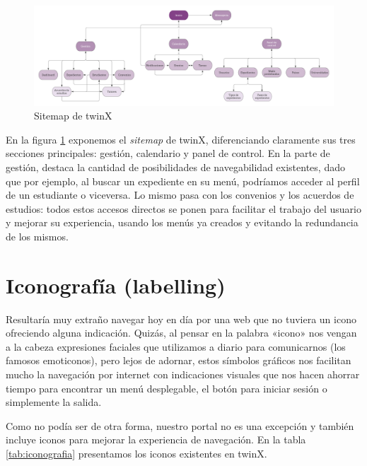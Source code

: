 \begin{figure}
	\centering
	\includegraphics[width=\textwidth]{img/sitemap}
	\caption{Sitemap de twinX}
	\label{fig:sitemap}
\end{figure}

En la figura \ref{fig:sitemap} exponemos el \textit{sitemap} de twinX, diferenciando claramente sus tres secciones principales: gestión, calendario y panel de control. En la parte de gestión, destaca la cantidad de posibilidades de navegabilidad existentes, dado que por ejemplo, al buscar un expediente en su menú, podríamos acceder al perfil de un estudiante o viceversa. Lo mismo pasa con los convenios y los acuerdos de estudios: todos estos accesos directos se ponen para facilitar el trabajo del usuario y mejorar su experiencia, usando los menús ya creados y evitando la redundancia de los mismos.


\section{Iconografía (labelling)}

Resultaría muy extraño navegar hoy en día por una web que no tuviera un icono ofreciendo alguna indicación. Quizás, al pensar en la palabra «icono» nos vengan a la cabeza expresiones faciales que utilizamos a diario para comunicarnos (los famosos emoticonos), pero lejos de adornar, estos símbolos gráficos nos facilitan mucho la navegación por internet con indicaciones visuales que nos hacen ahorrar tiempo para encontrar un menú desplegable, el botón para iniciar sesión o simplemente la salida.

Como no podía ser de otra forma, nuestro portal no es una excepción y también incluye iconos para mejorar la experiencia de navegación. En la tabla \ref{tab:iconografia} presentamos los iconos existentes en twinX.

